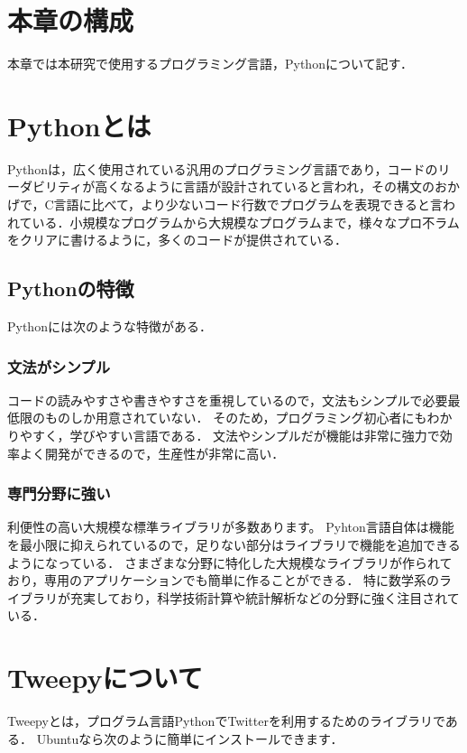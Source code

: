 \section{本章の構成}
本章では本研究で使用するプログラミング言語，Pythonについて記す．

\section{Pythonとは}
Pythonは，広く使用されている汎用のプログラミング言語であり，コードのリーダビリティが高くなるように言語が設計されていると言われ，その構文のおかげで，C言語に比べて，より少ないコード行数でプログラムを表現できると言われている．小規模なプログラムから大規模なプログラムまで，様々なプロ不ラムをクリアに書けるように，多くのコードが提供されている．
\subsection{Pythonの特徴}

Pythonには次のような特徴がある．

\subsubsection{文法がシンプル}
コードの読みやすさや書きやすさを重視しているので，文法もシンプルで必要最低限のものしか用意されていない．
そのため，プログラミング初心者にもわかりやすく，学びやすい言語である．
文法やシンプルだが機能は非常に強力で効率よく開発ができるので，生産性が非常に高い．

\subsubsection{専門分野に強い}
利便性の高い大規模な標準ライブラリが多数あります。
Pyhton言語自体は機能を最小限に抑えられているので，足りない部分はライブラリで機能を追加できるようになっている．
さまざまな分野に特化した大規模なライブラリが作られており，専用のアプリケーションでも簡単に作ることができる．
特に数学系のライブラリが充実しており，科学技術計算や統計解析などの分野に強く注目されている．

\clearpage

\section {Tweepyについて}
Tweepyとは，プログラム言語PythonでTwitterを利用するためのライブラリである．
Ubuntuなら次のように簡単にインストールできます．

